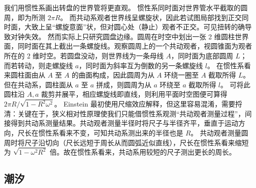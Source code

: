 我们用惯性系画出转盘的世界管将更直观。
惯性系同时面对世界管水平截取的圆周，即为所测 $2\pi R$。
而共动系观者世界线呈螺旋状，因此若试图局部找到正交同时面，大致上呈“螺旋意面”状，但对圆心处（静止）观者不正交。可见扭转的确导致对钟失效。
然而实际上只研究圆盘边缘。圆周在时空中划出一张 2 维圆柱世界面，同时面在其上截出一条螺旋线。观察圆周上的一个共动观者，视圆锥面为观者所在的 2 维时空。若圆盘没动，则世界线为一条母线 $A$，同时面为底部圆周 $L$；而若转动，则走螺旋线 $a$，同时面为斜率互为倒数的另一条螺旋线 $l$。
在惯性系看来圆柱面由从 $A$ 至 $A$ 的曲面构成，因此圆周为从 $A$ 环绕一圈至 $A$ 截取所得 $L$。但在共动系，圆柱面从 $a$ 至 $a$ 拼成，则圆周为从 $a$ 环绕至 $a$ 截取所得 $l$。
可将此圆柱沿 $A,a$ 裁剪并展平，相应螺旋线即直线，则利用平面时空图便可算得 $2\pi R/\sqrt{1-R^2\omega^2}$。
Einstein 最初使用尺缩效应解释，但这里容易混淆，需要捋清：关键在于，狭义相对性原理使我们只能借惯性系观测“共动观者测量过程”，间接得到共动系测量结果。共动观者测量半径时将尺子与半径齐平，垂直于运动方向，尺长在惯性系看来不变，可知共动系测出来的半径也是 $R$。
共动观者测量圆周时将尺子沿切向（尺长远短于周长从而圆弧近似直线），尺长在惯性系看来缩短为 $\sqrt{1-\omega^2R^2}$ 倍。故在惯性系看来，共动系用较短的尺子测出更长的周长。


\subsection{潮汐}\label{sec:tidal}

